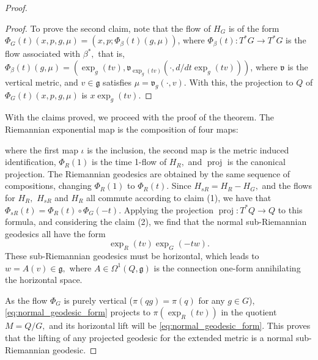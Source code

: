 \documentclass[12pt, letterpaper, reqno]{amsart}
\theoremstyle{definition}
\theoremstyle{plain}
\theoremstyle{remark}
\begin{document}
\begin{proof}
\begin{proof}
		To prove the second claim, note that the flow of $ H_G $ is of the form $\Phi_G(t)(x,p,g,\mu)= (x,p; \Phi_\beta(t)(g,\mu))$, where $ \Phi_\beta(t): T^*G \rightarrow T^*G$ is the flow associated with $ \beta^*, $ that is, $ \Phi_\beta(t)(g,\mu)=( \operatorname{exp}_g(tv), \mathfrak{v}_{ \operatorname{exp}_g(tv) }(\cdot, d/dt \operatorname{exp}_g(tv) ) ) $, where $ \mathfrak{v} $ is the vertical metric, and $ v \in \mathfrak{g} $ satisfies $ \mu = \mathfrak{v}_g(\cdot,v). $ With this, the projection to $ Q $ of $ \Phi_G(t)(x,p,g,\mu) $ is $ x \operatorname{exp}_g(tv). $  
	\end{proof}
	With the claims proved, we proceed with the proof of the theorem. The Riemannian exponential map is the composition of four maps:
	\begin{center}
	\end{center}
	where the first map $ \iota $ is the inclusion, the second map is the metric induced identification, $ \Phi_R(1) $ is the time 1-flow of $ H_R, $ and $ \operatorname{proj}  $ is the canonical projection. The Riemannian geodesics are obtained by the same sequence of compositions, changing $ \Phi_R(1) $ to $ \Phi_R(t). $ Since $ H_{sR} = H_R - H_G, $ and the flows for $ H_R, $ $ H_{sR} $ and $ H_R $ all commute according to claim (1), we have that $ \Phi_{sR}(t)= \Phi_R(t)\circ \Phi_G(-t). $  Applying the projection $ \operatorname{proj} :T^*Q \rightarrow Q $ to this formula, and considering the claim (2), we find that the normal sub-Riemannian geodesics all have the form 
	\begin{equation}\label{eq:normal_geodesic_form}
		\operatorname{exp}_R(tv)  \operatorname{exp}_G(-tw).
	\end{equation}
	These sub-Riemannian geodesics must be horizontal, which leads to $ w=A(v)\in \mathfrak{g}, $ where $A\in \Omega^1(Q, \mathfrak{g})$ is the connection one-form annihilating the horizontal space.

	As the flow $ \Phi_G $ is purely vertical ($\pi(qg)=\pi(q)$ for any $ g\in G $), \eqref{eq:normal_geodesic_form} projects to $ \pi( \operatorname{exp}_R(tv)) $ in the quotient $ M=Q/G, $ and its horizontal lift will be \eqref{eq:normal_geodesic_form}. This proves that the lifting of any projected geodesic for the extended metric is a normal sub-Riemannian geodesic.


\end{proof}
\end{document}
